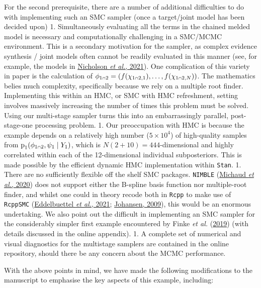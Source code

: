 \documentclass[
  10pt,
  a4paper,
]{article}
\let\Oldcap\cap
\renewcommand{\cap}{\mathrel{\mathsmaller{\Oldcap}}}
\newcommand{\pd}{\text{p}}
\begin{document}
For the second prerequisite, there are a number of additional
difficulties to do with implementing such an SMC sampler (once a
target/joint model has been decided upon) 1. Simultaneously evaluating
all the terms in the chained melded model is necessary and
computationally challenging in a SMC/MCMC environment. This is a
secondary motivation for the sampler, as complex evidence synthesis /
joint models often cannot be readily evaluated in this manner (see, for
example, the models in
\protect\hyperlink{ref-nicholson_interoperability_2021}{Nicholson
\emph{et al.}, 2021}). One complication of this variety in paper is the
calculation of
\(\phi_{1 \cap 2} = (f(\chi_{1 \cap 2, 1}), \ldots, f(\chi_{1 \cap 2, N}))\).
The mathematics belies much complexity, specifically because we rely on
a multiple root finder. Implementing this within an HMC, or SMC with HMC
refreshment, setting involves massively increasing the number of times
this problem must be solved. Using our multi-stage sampler turns this
into an embarrassingly parallel, post-stage-one processing problem. 1.
Our preoccupation with HMC is because the example depends on a
relatively high number (\(5 \times 10^{4}\)) of high-quality samples
from \(\pd_{1}(\phi_{1 \cap 2}, \psi_{1} \mid Y_{1})\), which is
\(N(2 + 10) = 444\)-dimensional and highly correlated within each of the
12-dimensional individual subposteriors. This is made possible by the
efficient dynamic HMC implementation within \texttt{Stan}. 1. There are
no sufficiently flexible off the shelf SMC packages. \texttt{NIMBLE}
(\protect\hyperlink{ref-michaud_sequential_2020}{Michaud \emph{et al.},
2020}) does not support either the B-spline basis function nor
multiple-root finder, and whilst one could in theory recode both in
\texttt{Rcpp} to make use of \texttt{RcppSMC}
(\protect\hyperlink{ref-eddelbuettel_rcppsmc_2021}{Eddelbuettel \emph{et
al.}, 2021}; \protect\hyperlink{ref-johansen_smctc_2009}{Johansen,
2009}), this would be an enormous undertaking. We also point out the
difficult in implementing an SMC sampler for the considerably simpler
first example encountered by Finke \emph{et al.}
(\protect\hyperlink{ref-finke_efficient_2019}{2019}) (with details
discussed in the online appendix). 1. A complete set of numerical and
visual diagnostics for the multistage samplers are contained in the
online repository, should there be any concern about the MCMC
performance.

With the above points in mind, we have made the following modifications
to the manuscript to emphasise the key aspects of this example,
including:
\end{document}
